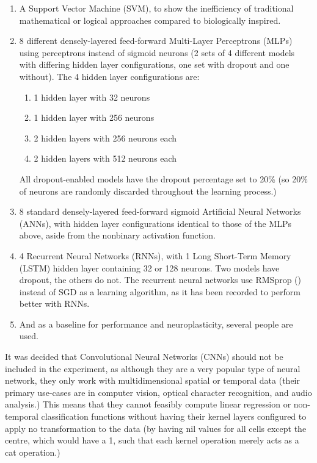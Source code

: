 \documentclass[]{report}
\begin{document}
\begin{enumerate}
	\item A Support Vector Machine (SVM), to show the inefficiency of traditional mathematical or logical approaches compared to biologically inspired.
	\item 8 different densely-layered feed-forward Multi-Layer Perceptrons (MLPs) using perceptrons instead of sigmoid neurons (2 sets of 4 different models with differing hidden layer configurations, one set with dropout and one without).
	\newline
	The 4 hidden layer configurations are:
	\begin{enumerate}
		\item 1 hidden layer with 32 neurons
		\item 1 hidden layer with 256 neurons
		\item 2 hidden layers with 256 neurons each
		\item 2 hidden layers with 512 neurons each
	\end{enumerate}
	All dropout-enabled models have the dropout percentage set to 20\% (so 20\% of neurons are randomly discarded throughout the learning process.)
	\item 8 standard densely-layered feed-forward sigmoid Artificial Neural Networks (ANNs), with hidden layer configurations identical to those of the MLPs above, aside from the nonbinary activation function.
	\item 4 Recurrent Neural Networks (RNNs), with 1 Long Short-Term Memory (LSTM) hidden layer containing 32 or 128 neurons. Two models have dropout, the others do not.
	\newline
	The recurrent neural networks use RMSprop (\cite{hinton2012neural}) instead of SGD as a learning algorithm, as it has been recorded to perform better with RNNs.
	\item And as a baseline for performance and neuroplasticity, several people are used.
\end{enumerate}

It was decided that Convolutional Neural Networks (CNNs) should not be included in the experiment, as although they are a very popular type of neural network, they only work with multidimensional spatial or temporal data (their primary use-cases are in computer vision, optical character recognition, and audio analysis.) This means that they cannot feasibly compute linear regression or non-temporal classification functions without having their kernel layers configured to apply no transformation to the data (by having nil values for all cells except the centre, which would have a 1, such that each kernel operation merely acts as a cat operation.)
\end{document}
